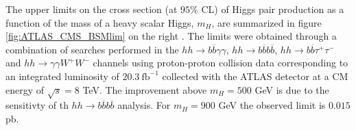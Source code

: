 The upper limits on the cross section (at $95\%$ CL) of Higgs pair production as a function of the mass of a heavy scalar Higgs, $m_H$, are summarized in figure \ref{fig:ATLAS_CMS_BSMlim} on the right \cite{ATLAShhBSMcomb}. The limits were obtained through a combination of searches performed in the $hh\rightarrow b\overline{b}\gamma\gamma$, $hh\rightarrow b\overline{b}b\overline{b}$, $hh\rightarrow b\overline{b}\tau^+\tau^-$ and $hh\rightarrow \gamma\gamma W^+W^-$ channels using proton-proton collision data corresponding to an integrated luminosity of $20.3~\text{fb}^{-1}$ collected with the ATLAS detector at a CM energy of $\sqrt{s}=8$ TeV. The improvement above $m_H=500$ GeV is due to the sensitivty of th $hh\rightarrow b\overline{b}b\overline{b}$ analysis. For $m_H=900$ GeV the observed limit is $0.015$ pb.


